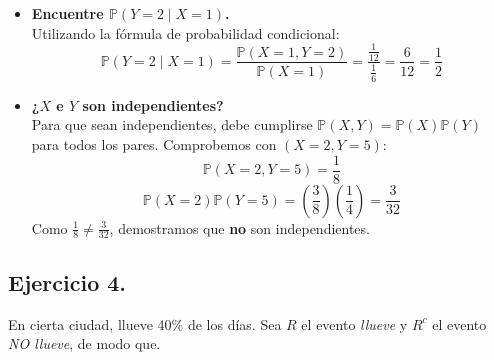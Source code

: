 \documentclass[10pt,a4paper]{book}
\begin{document}
\begin{itemize}
    \item[\textbf{c)}] \textbf{Encuentre $\mathbb{P}(Y = 2 \mid X = 1)$.} \\
    Utilizando la fórmula de probabilidad condicional:
    \[ \mathbb{P}(Y=2 \mid X=1) = \frac{\mathbb{P}(X=1, Y=2)}{\mathbb{P}(X=1)} = \frac{\frac{1}{12}}{\frac{1}{6}} = \frac{6}{12} = \frac{1}{2} \]

    \item[\textbf{d)}] \textbf{¿$X$ e $Y$ son independientes?} \\
    Para que sean independientes, debe cumplirse $\mathbb{P}(X, Y) = \mathbb{P}(X)\mathbb{P}(Y)$ para todos los pares. Comprobemos con $(X=2, Y=5)$:
    \[ \mathbb{P}(X=2, Y=5) = \frac{1}{8} \]
    \[ \mathbb{P}(X=2)\mathbb{P}(Y=5) = \left(\frac{3}{8}\right)\left(\frac{1}{4}\right) = \frac{3}{32} \]
    Como $\frac{1}{8} \neq \frac{3}{32}$, demostramos que \textbf{no} son independientes.
\end{itemize}

\newpage

\subsection{Ejercicio 4.} En cierta ciudad, llueve \(40\%\) de los días. Sea \(R\) el evento \textit{llueve} y \(R^{c}\) el evento \textit{NO llueve}, de modo que.
\end{document}
